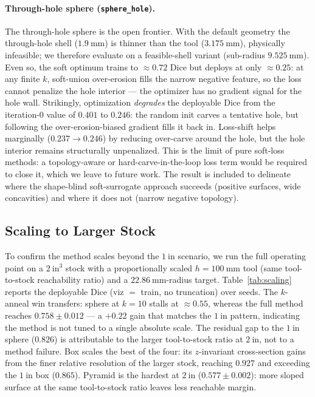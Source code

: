\paragraph{Through-hole sphere (\texttt{sphere\_hole}).}
The through-hole sphere is the open frontier. With the default geometry the
through-hole shell ($1.9~\mathrm{mm}$) is thinner than the tool
($3.175~\mathrm{mm}$), physically infeasible; we therefore evaluate on a
feasible-shell variant (sub-radius $9.525~\mathrm{mm}$). Even so, the soft
optimum trains to $\approx 0.72$ Dice but deploys at only $\approx 0.25$:
at any finite $k$, soft-union over-erosion fills the narrow negative feature, so
the loss cannot penalize the hole interior --- the optimizer has no gradient
signal for the hole wall. Strikingly, optimization \emph{degrades} the
deployable Dice from the iteration-0 value of $0.401$ to $0.246$: the random
init carves a tentative hole, but following the over-erosion-biased gradient
fills it back in. Loss-shift helps marginally ($0.237 \to 0.246$) by reducing
over-carve around the hole, but the hole interior remains structurally
unpenalized. This is the limit of pure soft-loss methods: a topology-aware or
hard-carve-in-the-loop loss term would be required to close it, which we leave
to future work. The result is included to delineate where the shape-blind
soft-surrogate approach succeeds (positive surfaces, wide concavities) and
where it does not (narrow negative topology).

\subsection{Scaling to Larger Stock}
\label{sec:scaling}

To confirm the method scales beyond the $1~\mathrm{in}$ scenario, we run the full
operating point on a $2~\mathrm{in}^3$ stock with a proportionally scaled
$h{=}100~\mathrm{mm}$ tool (same tool-to-stock reachability ratio) and a
$22.86~\mathrm{mm}$-radius target. Table~\ref{tab:scaling} reports the
deployable Dice (viz $=$ train, no truncation) over seeds. The $k$-anneal win
transfers: sphere at $k{=}10$ stalls at $\approx 0.55$, whereas the full method
reaches $0.758 \pm 0.012$ --- a $+0.22$ gain that matches the $1~\mathrm{in}$
pattern, indicating the method is not tuned to a single absolute scale. The
residual gap to the $1~\mathrm{in}$ sphere ($0.826$) is attributable to the
larger tool-to-stock ratio at $2~\mathrm{in}$, not to a method failure. Box
scales the best of the four: its $z$-invariant cross-section gains from the
finer relative resolution of the larger stock, reaching $0.927$ and exceeding
the $1~\mathrm{in}$ box ($0.865$). Pyramid is the hardest at $2~\mathrm{in}$
($0.577 \pm 0.002$): more sloped surface at the same tool-to-stock ratio leaves
less reachable margin.

